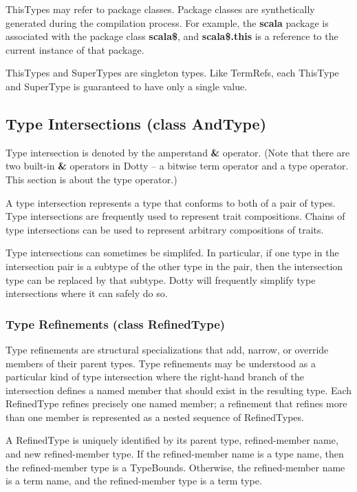 \documentclass[11pt]{report}
\newcommand{\cdf}{\bf\ttfamily} %
\newcommand{\cd}{\cdf\small}  %
\begin{document}
ThisTypes may refer to package classes. Package classes are synthetically generated during the compilation process. For example, the {\cd scala} package is associated with the package class {\cd scala\$}, and \mbox{\cd scala\$.this} is a reference to the current instance of that package.

ThisTypes and SuperTypes are singleton types. Like TermRefs, each ThisType and SuperType is guaranteed to have only a single value.

\subsection{Type Intersections (class AndType)} \label{sec:type-intersection}

Type intersection is denoted by the amperstand {\cd \&} operator. (Note that there are two built-in {\cd \&} operators in Dotty -- a bitwise term operator and a type operator. This section is about the type operator.) 

A type intersection represents a type that conforms to both of a pair of types. Type intersections are frequently used to represent trait compositions. Chains of type intersections can be used to represent arbitrary compositions of traits.

Type intersections can sometimes be simplifed. In particular, if one type in the intersection pair is a subtype of the other type in the pair, then the intersection type can be replaced by that subtype. Dotty will frequently simplify type intersections where it can safely do so.

\subsubsection{Type Refinements (class RefinedType)}

Type refinements are structural specializations that add, narrow, or override members of their parent types. Type refinements may be understood as a particular kind of type intersection where the right-hand branch of the intersection defines a named member that should exist in the resulting type. Each RefinedType refines precisely one named member; a refinement that refines more than one member is represented as a nested sequence of RefinedTypes.

A RefinedType is uniquely identified by its parent type, refined-member name, and new refined-member type. If the refined-member name is a type name, then the refined-member type is a TypeBounds. Otherwise, the refined-member name is a term name, and the refined-member type is a term type.
\end{document}
